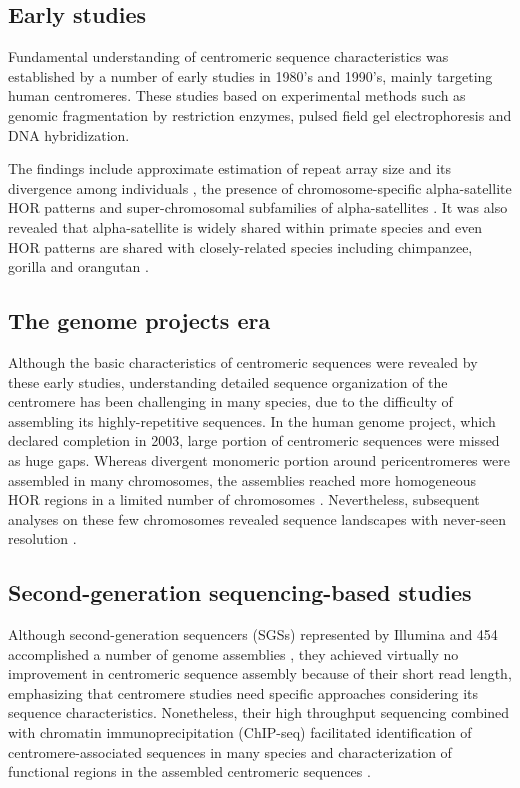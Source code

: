 \subsection*{Early studies}
  Fundamental understanding of centromeric sequence characteristics was established by a number of early studies in 1980's and 1990's, mainly targeting human centromeres. These studies based on experimental methods such as genomic fragmentation by restriction enzymes, pulsed field gel electrophoresis and DNA hybridization.

  The findings include approximate estimation of repeat array size and its divergence among individuals \cite{Oakey1990}, the presence of chromosome-specific alpha-satellite HOR patterns \cite{Willard1987} and super-chromosomal subfamilies of alpha-satellites \cite{Alexandrov2001}. It was also revealed that alpha-satellite is widely shared within primate species and even HOR patterns are shared with closely-related species including chimpanzee, gorilla and orangutan \cite{Willard1991}.


\subsection*{The genome projects era}
  Although the basic characteristics of centromeric sequences were revealed by these early studies, understanding detailed sequence organization of the centromere has been challenging in many species, due to the difficulty of assembling its highly-repetitive sequences. In the human genome project, which declared completion in 2003, large portion of centromeric sequences were missed as huge gaps. Whereas divergent monomeric portion around pericentromeres were assembled in many chromosomes, the assemblies reached more homogeneous HOR regions in a limited number of chromosomes \cite{M.KatharineRuddand2004, She2004}. Nevertheless, subsequent analyses on these few chromosomes revealed sequence landscapes with never-seen resolution \cite{Schueler2001, Ross2005, Nusbaum2006, Rudd2006}.



\subsection*{Second-generation sequencing-based studies}
  Although second-generation sequencers (SGSs) represented by Illumina and 454 accomplished a number of genome assemblies \cite{Schatz2010}, they achieved virtually no improvement in centromeric sequence assembly because of their short read length, emphasizing that centromere studies need specific approaches considering its sequence characteristics. Nonetheless, their high throughput sequencing combined with chromatin immunoprecipitation (ChIP-seq) facilitated identification of centromere-associated sequences in many species \cite{} and characterization of functional regions in the assembled centromeric sequences \cite{Hayden2013}.


